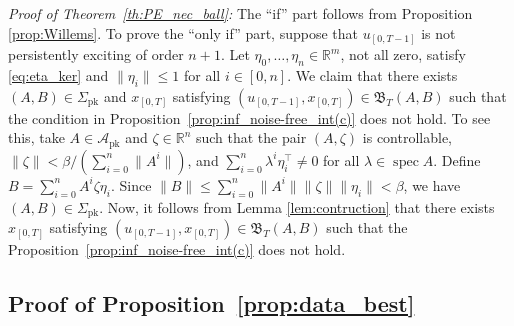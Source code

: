 \documentclass[journal,twoside,web]{ieeecolor}
\DeclareMathOperator{\spec}{spec}
\begin{document}
\textit{Proof of Theorem~\ref{th:PE_nec_ball}:} The ``if'' part follows from Proposition \ref{prop:Willems}. To prove the ``only if'' part, suppose that $u_{[0,T-1]}$ is not persistently exciting of order $n+1$. Let \mbox{$\eta_0,\ldots,\eta_n\in\mathbb{R}^m$}, not all zero, satisfy \eqref{eq:eta_ker} and $\|\eta_i\|\leq 1$ for all \mbox{$i\in[0,n]$}. We claim that there exists \mbox{$(A,B)\in\Sigma_\text{pk}$} and $x_{[0,T]}$ satisfying \mbox{$(u_{[0,T-1]},x_{[0,T]})\in\mathfrak{B}_T(A,B)$} such that the condition in Proposition~\ref{prop:inf_noise-free_int(c)} does not hold. To see this, take \mbox{$A\in\mathcal{A}_\text{pk}$} and \mbox{$\zeta\in\mathbb{R}^n$} such that the pair $(A,\zeta)$ is controllable, \mbox{$\|\zeta\|< \beta/(\sum_{i=0}^n\|A^i\|)$}, and \mbox{$\sum_{i=0}^n \lambda^i \eta_i^\top\neq 0$} for all $\lambda\in\spec A$. Define \mbox{$B=\sum_{i=0}^n A^i\zeta\eta_i$}. Since \mbox{$\|B\|\leq\sum_{i=0}^n \|A^i\|\|\zeta\|\|\eta_i\|<\beta$}, we have \mbox{$(A,B)\in\Sigma_\text{pk}$}. Now, it follows from Lemma \ref{lem:contruction} that there exists $x_{[0,T]}$ satisfying $(u_{[0,T-1]},x_{[0,T]})\in\mathfrak{B}_T(A,B)$ such that the Proposition~\ref{prop:inf_noise-free_int(c)} does not hold. \hfill \QED

\subsection{Proof of Proposition~\ref{prop:data_best}}
\end{document}
